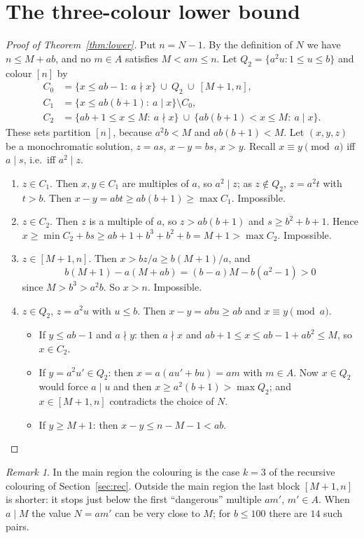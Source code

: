 \documentclass[11pt,a4paper]{article}
\theoremstyle{definition}
\theoremstyle{remark}
\newtheorem{remark}[theorem]{Remark}
\begin{document}
\section{The three-colour lower bound}\label{sec:lower}
\begin{proof}[Proof of Theorem~\ref{thm:lower}]
Put $n=N-1$. By the definition of $N$ we have $n\le M+ab$, and no $m\in A$ satisfies $M<am\le n$.
Let $Q_2=\{a^2u:1\le u\le b\}$ and colour $[n]$ by
\begin{align*}
C_0&=\{x\le ab-1:\ a\nmid x\}\ \cup\ Q_2\ \cup\ [M+1,n],\\
C_1&=\{x\le ab(b+1):\ a\mid x\}\setminus C_0,\\
C_2&=\{ab+1\le x\le M:\ a\nmid x\}\ \cup\ \{ab(b+1)<x\le M:\ a\mid x\}.
\end{align*}
These sets partition $[n]$, because $a^2b<M$ and $ab(b+1)<M$. Let $(x,y,z)$ be a monochromatic solution, $z=as$, $x-y=bs$, $x>y$. Recall $x\equiv y\pmod a$ iff $a\mid s$, i.e.\ iff $a^2\mid z$.
\begin{enumerate}[label=(\roman*)]
\item $z\in C_1$. Then $x,y\in C_1$ are multiples of $a$, so $a^2\mid z$; as $z\notin Q_2$, $z=a^2t$ with $t>b$. Then $x-y=abt\ge ab(b+1)\ge\max C_1$. Impossible.
\item $z\in C_2$. Then $z$ is a multiple of $a$, so $z>ab(b+1)$ and $s\ge b^2+b+1$. Hence $x\ge\min C_2+bs\ge ab+1+b^3+b^2+b=M+1>\max C_2$. Impossible.
\item $z\in[M+1,n]$. Then $x>bz/a\ge b(M+1)/a$, and
\[
  b(M+1)-a(M+ab)=(b-a)M-b(a^2-1)>0
\]
since $M>b^3>a^2b$. So $x>n$. Impossible.
\item $z\in Q_2$, $z=a^2u$ with $u\le b$. Then $x-y=abu\ge ab$ and $x\equiv y\pmod a$.
  \begin{itemize}
  \item If $y\le ab-1$ and $a\nmid y$: then $a\nmid x$ and $ab+1\le x\le ab-1+ab^2\le M$, so $x\in C_2$.
  \item If $y=a^2u'\in Q_2$: then $x=a(au'+bu)=am$ with $m\in A$. Now $x\in Q_2$ would force $a\mid u$ and then $x\ge a^2(b+1)>\max Q_2$; and $x\in[M+1,n]$ contradicts the choice of $N$.
  \item If $y\ge M+1$: then $x-y\le n-M-1<ab$. \qedhere
  \end{itemize}
\end{enumerate}
\end{proof}

\begin{remark}
In the main region the colouring is the case $k=3$ of the recursive colouring of Section~\ref{sec:rec}. Outside the main region the last block $[M+1,n]$ is shorter: it stops just below the first ``dangerous'' multiple $am'$, $m'\in A$. When $a\mid M$ the value $N=am'$ can be very close to $M$; for $b\le100$ there are $14$ such pairs.
\end{remark}
\end{document}
